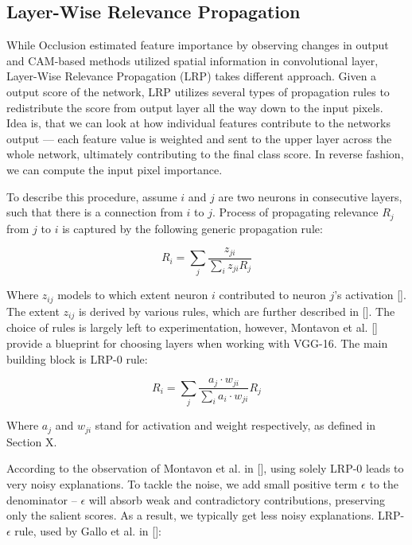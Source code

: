 \subsection{Layer-Wise Relevance Propagation}

While Occlusion estimated feature importance by observing changes in output and CAM-based methods utilized spatial information in convolutional layer, Layer-Wise Relevance Propagation (LRP) takes different approach. Given a output score of the network, LRP utilizes several types of propagation rules to redistribute the score from output layer all the way down to the input pixels. Idea is, that we can look at how individual features contribute to the networks output --- each feature value is weighted and sent to the upper layer across the whole network, ultimately contributing to the final class score. In reverse fashion, we can compute the input pixel importance.

To describe this procedure, assume $i$ and $j$ are two neurons in consecutive layers, such that there is a connection from $i$ to $j$. Process of propagating relevance $R_j$ from $j$ to $i$ is captured by the following generic propagation rule:

\begin{equation}
    R_i = \sum_j \frac{z_{ji}}{\sum_i z_{ji} R_j}
\end{equation}

Where $z_{ij}$ models to which extent neuron $i$ contributed to neuron $j$'s activation []. The extent $z_{ij}$ is derived by various rules, which are further described in []. The choice of rules is largely left to experimentation, however, Montavon et al. [] provide a blueprint for choosing layers when working with VGG-16. The main building block is LRP-$0$ rule:

\begin{equation}
    R_i = \sum_j \frac{a_j \cdot w_{ji}}{\sum_i a_i \cdot w_{ji}} R_j
\end{equation}

Where $a_j$ and $w_{ji}$ stand for activation and weight respectively, as defined in Section X.

According to the observation of Montavon et al. in [], using solely LRP-$0$ leads to very noisy explanations. To tackle the noise, we add small positive term $\epsilon$ to the denominator -- $\epsilon$ will absorb weak and contradictory contributions, preserving only the salient scores. As a result, we typically get less noisy explanations. LRP-$\epsilon$ rule, used by Gallo et al. in []:

